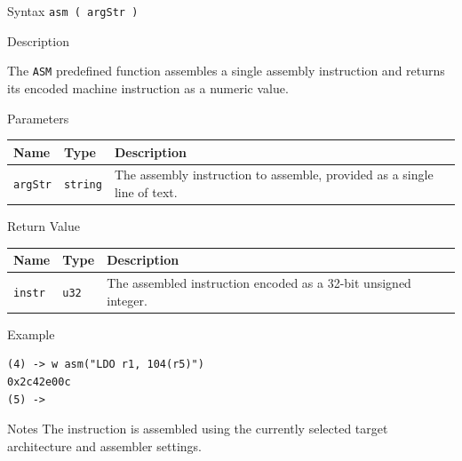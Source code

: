 %
%
\pagebreak
{}

\begin{iPageDescEntry}{Syntax}
\texttt{asm ( argStr )} \\
\end{iPageDescEntry}

\begin{iPageDescEntry}{Description}

The \texttt{ASM} predefined function assembles a single assembly instruction
and returns its encoded machine instruction as a numeric value.

\end{iPageDescEntry}

\begin{iPageDescEntry}{Parameters}

\begin{tabularx}{\linewidth}{|l|l|X|}
\hline
\textbf{Name} & \textbf{Type} & \textbf{Description} \\ \hline
\texttt{argStr} & \texttt{string} &
The assembly instruction to assemble, provided as a single line of text. \\ \hline
\end{tabularx}

\end{iPageDescEntry}

\begin{iPageDescEntry}{Return Value}

\begin{tabularx}{\linewidth}{|l|l|X|}
\hline
\textbf{Name} & \textbf{Type} & \textbf{Description} \\ \hline
\texttt{instr} & \texttt{u32} &
The assembled instruction encoded as a 32-bit unsigned integer. \\ \hline
\end{tabularx}

\end{iPageDescEntry}

\begin{iPageDescOpEntry}{Example}
\begin{lstlisting}[style=iPageOpStyle]
(4) -> w asm("LDO r1, 104(r5)")
0x2c42e00c
(5) ->
\end{lstlisting}
\end{iPageDescOpEntry}

\begin{iPageDescEntry}{Notes}
The instruction is assembled using the currently selected target architecture
and assembler settings.
\end{iPageDescEntry}
